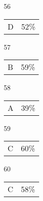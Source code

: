 \documentclass[12pt]{article}
\begin{document}
\begin{multicols}{5}
\begin{enumerate}
\item[]
\item[56] \begin{tabular}{cc} D & 52\%\end{tabular}
\item[57] \begin{tabular}{cc} B & 59\%\end{tabular}
\item[58] \begin{tabular}{cc} A & 39\%\end{tabular}
\item[59] \begin{tabular}{cc} C & 60\%\end{tabular}
\item[60] \begin{tabular}{cc} C & 58\%\end{tabular}

\item[]


\end{enumerate}
\end{multicols}
\end{document}
